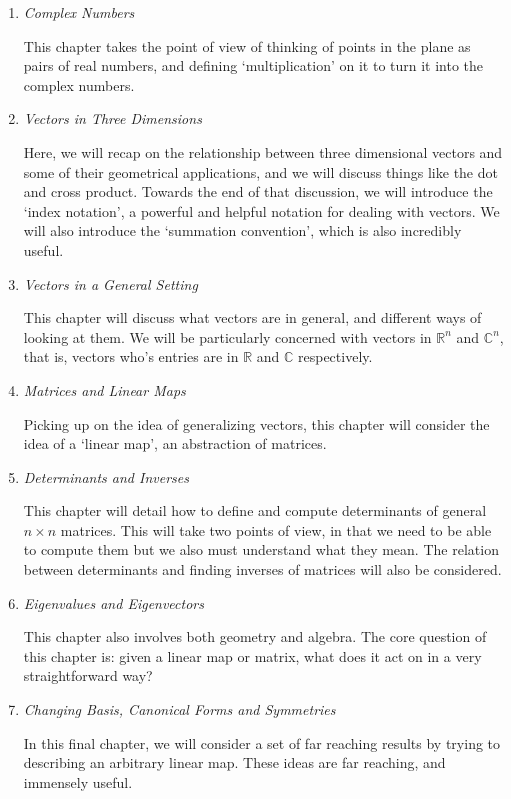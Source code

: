 \documentclass[a4paper]{scrreprt}
\begin{document}
\begin{enumerate}
	\item \emph{Complex Numbers}

	This chapter takes the point of view of thinking of points in the plane as pairs of real numbers, and defining `multiplication' on it to turn it into the complex numbers.

	\item \emph{Vectors in Three Dimensions}
	
	Here, we will recap on the relationship between three dimensional vectors and some of their geometrical applications, and we will discuss things like the dot and cross product. Towards the end of that discussion, we will introduce the `index notation', a powerful and helpful notation for dealing with vectors. We will also introduce the `summation convention', which is also incredibly useful.

	\item \emph{Vectors in a General Setting}
	
	This chapter will discuss what vectors are in general, and different ways of looking at them. We will be particularly concerned with vectors in $\mathbb{R}^n$ and $\mathbb{C}^n$, that is, vectors who's entries are in $\mathbb{R}$ and $\mathbb{C}$ respectively.

	\item \emph{Matrices and Linear Maps}
	
	Picking up on the idea of generalizing vectors, this chapter will consider the idea of a `linear map', an abstraction of matrices. 

	\item \emph{Determinants and Inverses}
	
	This chapter will detail how to define and compute determinants of general $n \times n$ matrices. This will take two points of view, in that we need to be able to compute them but we also must understand what they mean. The relation between determinants and finding inverses of matrices will also be considered.

	\item \emph{Eigenvalues and Eigenvectors}
	
	This chapter also involves both geometry and algebra. The core question of this chapter is: given a linear map or matrix, what does it act on in a very straightforward way?

	\item \emph{Changing Basis, Canonical Forms and Symmetries}
	
	In this final chapter, we will consider a set of far reaching results by trying to describing an arbitrary linear map. These ideas are far reaching, and immensely useful.
\end{enumerate}
\end{document}
